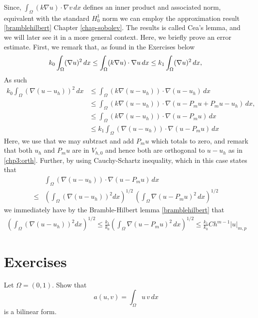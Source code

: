 Since, $\int_\Omega (k \nabla u) \cdot \nabla v \, dx$ defines an inner product and associated norm, equivalent with 
the standard $H^1_0$ norm we can employ the approximation result \eqref{bramblehilbert} Chapter \ref{chap-sobolev}. 
The results is called Cea's lemma, and we will later see it in a more general context. 
Here, we briefly prove an error estimate. First, we remark that, as found in the Exercises below  
\[
k_0 \int_\Omega (\nabla u)^2  \, dx \le   \int_\Omega (k \nabla u) \cdot \nabla u \, dx \le   
k_1 \int_\Omega (\nabla u)^2  \, dx,  \\  
\]
As such 
\begin{align*}
	k_0 \int_\Omega (\nabla (u-u_h))^2  \, dx &\le   \int_\Omega (k \nabla (u -u_h)) \cdot \nabla (u-u_h) \, dx \\    
&\le   \int_\Omega (k \nabla (u -u_h)) \cdot \nabla (u-P_m u + P_m u - u_h) \, dx, \\ 
&\le   \int_\Omega (k \nabla (u -u_h)) \cdot \nabla (u-P_m u ) \, dx \\ 
&\le   k_1 \int_\Omega (\nabla (u -u_h)) \cdot \nabla (u-P_m u ) \, dx 
\end{align*}
Here, we use that we may subtract and add $P_m u$ which totals to zero, and remark that both $u_h$ and $P_m u$ 
are in $V_{h,0}$ and hence both are orthogonal to $u - u_h$ as in \eqref{chp3:orth}. 
Further, by using Cauchy-Schartz inequality, which in this case states that   
\begin{align*}
&  \int_\Omega ( \nabla (u -u_h)) \cdot \nabla (u-P_m u ) \, dx \\ \le  
&  
(\int_\Omega ( \nabla (u -u_h))^{2} dx )^{1/2} \,  (\int_\Omega \nabla (u-P_m u )^2 \, dx)^{1/2} 
\end{align*}
we immediately have by the Bramble-Hilbert lemma \eqref{bramblehilbert} that 
\begin{align}
(\int_\Omega ( \nabla (u -u_h))^{2} dx )^{1/2} \le \frac{k_1}{k_0}   (\int_\Omega \nabla (u-P_m u )^2 \, dx)^{1/2} 
 \le \frac{k_1}{k_0}  C h^{m-1} |u|_{m,p} 
\end{align}


\section{Exercises}

\begin{exercise}
\label{ex:bilinear}
Let $\Omega=(0,1)$.  
Show that 
\[  
a(u, v) = \int_\Omega  u \, v \, dx 
\]
is a bilinear form. 
\end{exercise}

